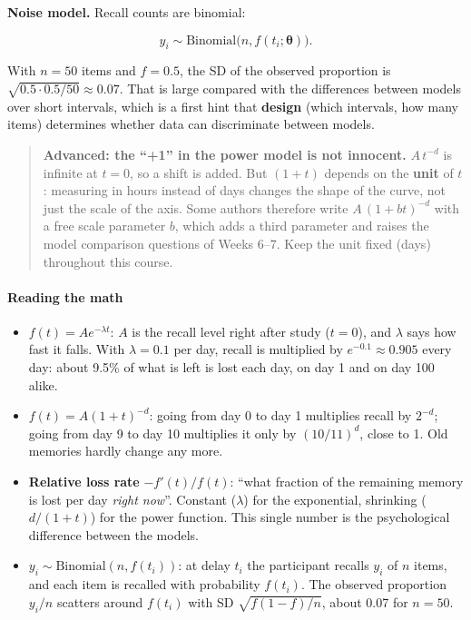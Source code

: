 \textbf{Noise model.} Recall counts are binomial:

\[
y_i \sim \mathrm{Binomial}\big(n, f(t_i; \boldsymbol\theta)\big).
\]

With \(n = 50\) items and \(f = 0.5\), the SD of the observed proportion
is \(\sqrt{0.5 \cdot 0.5 / 50} \approx 0.07\). That is large compared
with the differences between models over short intervals, which is a
first hint that \textbf{design} (which intervals, how many items)
determines whether data can discriminate between models.

\begin{quote}
\textbf{Advanced: the ``+1'' in the power model is not innocent.}
\(A\,t^{-d}\) is infinite at \(t = 0\), so a shift is added. But
\((1 + t)\) depends on the \textbf{unit} of \(t\): measuring in hours
instead of days changes the shape of the curve, not just the scale of
the axis. Some authors therefore write \(A\,(1 + bt)^{-d}\) with a free
scale parameter \(b\), which adds a third parameter and raises the model
comparison questions of Weeks 6--7. Keep the unit fixed (days)
throughout this course.
\end{quote}

\paragraph{Reading the math}

\begin{itemize}
\tightlist
\item
  \(f(t) = A e^{-\lambda t}\): \(A\) is the recall level right after
  study (\(t = 0\)), and \(\lambda\) says how fast it falls. With
  \(\lambda = 0.1\) per day, recall is multiplied by
  \(e^{-0.1} \approx 0.905\) every day: about 9.5\% of what is left is
  lost each day, on day 1 and on day 100 alike.
\item
  \(f(t) = A(1+t)^{-d}\): going from day 0 to day 1 multiplies recall by
  \(2^{-d}\); going from day 9 to day 10 multiplies it only by
  \((10/11)^{d}\), close to 1. Old memories hardly change any more.
\item
  \textbf{Relative loss rate} \(-f'(t)/f(t)\): ``what fraction of the
  remaining memory is lost per day \emph{right now}''. Constant
  (\(\lambda\)) for the exponential, shrinking (\(d/(1+t)\)) for the
  power function. This single number is the psychological difference
  between the models.
\item
  \(y_i \sim \mathrm{Binomial}(n, f(t_i))\): at delay \(t_i\) the
  participant recalls \(y_i\) of \(n\) items, and each item is recalled
  with probability \(f(t_i)\). The observed proportion \(y_i/n\)
  scatters around \(f(t_i)\) with SD \(\sqrt{f(1-f)/n}\), about 0.07 for
  \(n = 50\).
\end{itemize}

